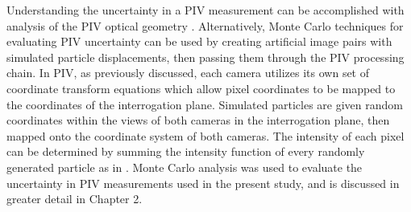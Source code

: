Understanding the uncertainty in a PIV measurement can be accomplished with 
analysis of the PIV optical geometry \cite{lawson1997b}. Alternatively, Monte 
Carlo techniques for evaluating PIV uncertainty can be used by creating 
artificial image pairs with simulated particle displacements, then passing them 
through the PIV processing chain. In PIV, as previously discussed, each camera 
utilizes its own set of coordinate transform equations which allow pixel 
coordinates to be mapped to the coordinates of the interrogation plane. 
Simulated particles are given random coordinates within the views of both 
cameras in the interrogation plane, then mapped onto the coordinate system of 
both cameras. The intensity of each pixel can be determined by summing the 
intensity function of every randomly generated particle as in 
\cite{adeyinka2005,fouras2007}. Monte Carlo analysis was used to evaluate the 
uncertainty in PIV measurements used in the present study, and is discussed in 
greater detail in Chapter 2.




